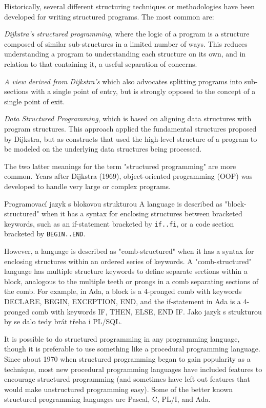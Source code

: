 \medskip
Historically, several different structuring techniques or methodologies have been developed for writing structured programs. The most common are:
\begin{pitemize}
    \item \emph{Dijkstra's structured programming}, where the logic of a program is a structure composed of similar sub-structures in a limited number of ways. This reduces understanding a program to understanding each structure on its own, and in relation to that containing it, a useful separation of concerns.
    \item \emph{A view derived from Dijkstra's} which also advocates splitting programs into sub-sections with a single point of entry, but is strongly opposed to the concept of a single point of exit.
    \item \emph{Data Structured Programming}, which is based on aligning data structures with program structures. This approach applied the fundamental structures proposed by Dijkstra, but as constructs that used the high-level structure of a program to be modeled on the underlying data structures being processed. 
\end{pitemize}
The two latter meanings for the term "structured programming" are more common. Years after Dijkstra (1969), object-oriented programming (OOP) was developed to handle very large or complex programs.

\medskip
\begin{definiceN}{Programovací jazyk s blokovou strukturou}
A language is described as "block-structured" when it has a syntax for enclosing structures between bracketed keywords, such as an if-statement bracketed by \texttt{if..fi}, or a code section bracketed by \texttt{BEGIN..END}. 

However, a language is described as "comb-structured" when it has a syntax for enclosing structures within an ordered series of keywords. A "comb-structured" language has multiple structure keywords to define separate sections within a block, analogous to the multiple teeth or prongs in a comb separating sections of the comb. For example, in Ada, a block is a 4-pronged comb with keywords DECLARE, BEGIN, EXCEPTION, END, and the if-statement in Ada is a 4-pronged comb with keywords IF, THEN, ELSE, END IF. Jako jazyk s  strukturou by se dalo tedy brát třeba i PL/SQL.
\end{definiceN}

\begin{poznamka}
It is possible to do structured programming in any programming language, though it is preferable to use something like a procedural programming language. Since about 1970 when structured programming began to gain popularity as a technique, most new procedural programming languages have included features to encourage structured programming (and sometimes have left out features that would make unstructured programming easy). Some of the better known structured programming languages are Pascal, C, PL/I, and Ada.
\end{poznamka}

